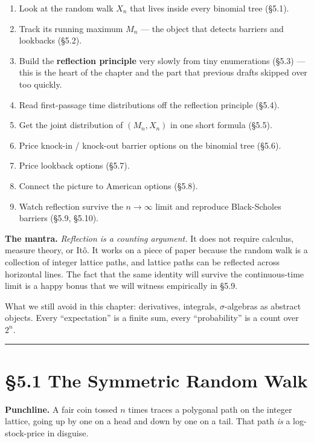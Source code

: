 \documentclass[
  10pt,
  twoside]{book}
\providecommand{\tightlist}{%
  \setlength{\itemsep}{0pt}\setlength{\parskip}{0pt}}
\begin{document}
\begin{enumerate}
\def\labelenumi{\arabic{enumi}.}
\tightlist
\item
  Look at the random walk \(X_n\) that lives inside every binomial tree
  (§5.1).
\item
  Track its running maximum \(M_n\) --- the object that detects barriers
  and lookbacks (§5.2).
\item
  Build the \textbf{reflection principle} very slowly from tiny
  enumerations (§5.3) --- this is the heart of the chapter and the part
  that previous drafts skipped over too quickly.
\item
  Read first-passage time distributions off the reflection principle
  (§5.4).
\item
  Get the joint distribution of \((M_n, X_n)\) in one short formula
  (§5.5).
\item
  Price knock-in / knock-out barrier options on the binomial tree
  (§5.6).
\item
  Price lookback options (§5.7).
\item
  Connect the picture to American options (§5.8).
\item
  Watch reflection survive the \(n \to \infty\) limit and reproduce
  Black-Scholes barriers (§5.9, §5.10).
\end{enumerate}

\textbf{The mantra.} \emph{Reflection is a counting argument.} It does
not require calculus, measure theory, or Itô. It works on a piece of
paper because the random walk is a collection of integer lattice paths,
and lattice paths can be reflected across horizontal lines. The fact
that the same identity will survive the continuous-time limit is a happy
bonus that we will witness empirically in §5.9.

What we still avoid in this chapter: derivatives, integrals,
\(\sigma\)-algebras as abstract objects. Every ``expectation'' is a
finite sum, every ``probability'' is a count over \(2^n\).

\begin{center}\rule{0.5\linewidth}{0.5pt}\end{center}

\section{§5.1 The Symmetric Random
Walk}\label{the-symmetric-random-walk}

\textbf{Punchline.} A fair coin tossed \(n\) times traces a polygonal
path on the integer lattice, going up by one on a head and down by one
on a tail. That path \emph{is} a log-stock-price in disguise.
\end{document}
